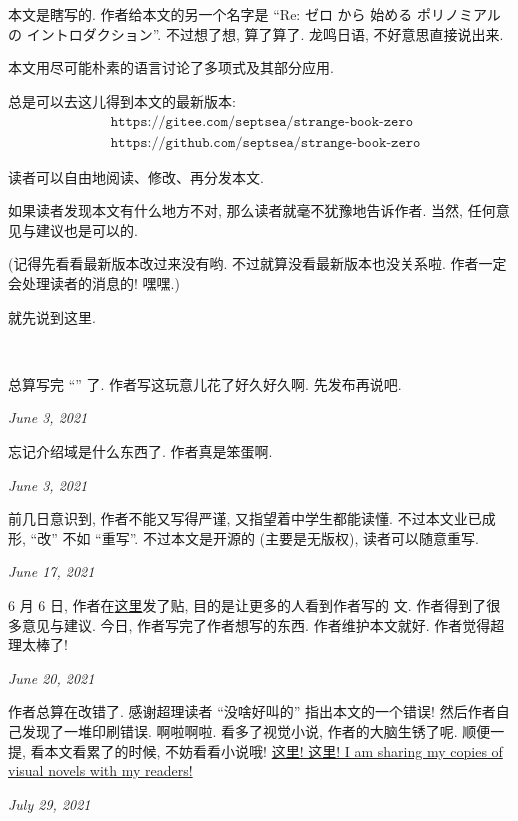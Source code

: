 \section*{\Preface}

本文是瞎写的. 作者给本文的另一个名字是 ``Re: ゼロ から 始める ポリノミアル の イントロダクション''. 不过想了想, 算了算了. 龙鸣日语, 不好意思直接说出来.

本文用尽可能朴素的语言讨论了多项式及其部分应用.

总是可以去这儿得到本文的最新版本:
\begin{align*}
     & \texttt{https://gitee.com/septsea/strange-book-zero}  \\
     & \texttt{https://github.com/septsea/strange-book-zero}
\end{align*}

读者可以自由地阅读、修改、再分发本文.

如果读者发现本文有什么地方不对, 那么读者就毫不犹豫地告诉作者. 当然, 任何意见与建议也是可以的.

(记得先看看最新版本改过来没有哟. 不过就算没看最新版本也没关系啦. 作者一定会处理读者的消息的! 嘿嘿.)

就先说到这里.

~\

\providecommand{\appendDate}{}
\renewcommand{\appendDate}[1]{\par \hfill {\itshape \sffamily #1}}

\begin{remark}
    总算写完 ``\Prerequisites '' 了. 作者写这玩意儿花了好久好久啊. 先发布再说吧.
    \appendDate{June 3, 2021}
\end{remark}

\begin{remark}
    忘记介绍域是什么东西了. 作者真是笨蛋啊.
    \appendDate{June 3, 2021}
\end{remark}

\begin{remark}
    前几日意识到, 作者不能又写得严谨, 又指望着中学生都能读懂. 不过本文业已成形, ``改'' 不如 ``重写''. 不过本文是开源的 (主要是无版权), 读者可以随意重写.
    \appendDate{June 17, 2021}
\end{remark}

\begin{remark}
    6 月 6 日, 作者在\hyperref{https://chaoli.club/index.php/6396}{}{}{这里}发了贴, 目的是让更多的人看到作者写的  文. 作者得到了很多意见与建议. 今日, 作者写完了作者想写的东西. 作者维护本文就好. 作者觉得超理太棒了!
    \appendDate{June 20, 2021}
\end{remark}

\begin{remark}
    作者总算在改错了. 感谢超理读者 ``没啥好叫的'' 指出本文的一个错误! 然后作者自己发现了一堆印刷错误. 啊啦啊啦. 看多了视觉小说, 作者的大脑生锈了呢. 顺便一提, 看本文看累了的时候, 不妨看看小说哦! \hyperref{https://gitee.com/septsea/ss}{}{}{这里! 这里! I am sharing my copies of visual novels with my readers!}
    \appendDate{July 29, 2021}
\end{remark}
